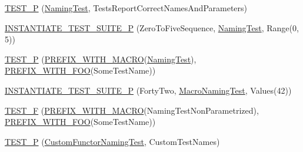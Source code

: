 \begin{DoxyCompactItemize}
\item 
\mbox{\hyperlink{_obj__test_2lib_2googletest-master_2googletest_2test_2googletest-param-test-test_8cc_a1f8ae152b21130f3ca99bdeab97e872a}{T\+E\+S\+T\+\_\+P}} (\mbox{\hyperlink{class_naming_test}{Naming\+Test}}, Tests\+Report\+Correct\+Names\+And\+Parameters)
\item 
\mbox{\hyperlink{_obj__test_2lib_2googletest-master_2googletest_2test_2googletest-param-test-test_8cc_a87cac0101217b77e84179b68e19cf84b}{I\+N\+S\+T\+A\+N\+T\+I\+A\+T\+E\+\_\+\+T\+E\+S\+T\+\_\+\+S\+U\+I\+T\+E\+\_\+P}} (Zero\+To\+Five\+Sequence, \mbox{\hyperlink{class_naming_test}{Naming\+Test}}, Range(0, 5))
\item 
\mbox{\hyperlink{_obj__test_2lib_2googletest-master_2googletest_2test_2googletest-param-test-test_8cc_a268b3f484920a6a3c08d911a47f07509}{T\+E\+S\+T\+\_\+P}} (\mbox{\hyperlink{_obj__test_2lib_2googletest-release-1_88_81_2googletest_2test_2googletest-param-test-test_8cc_aeb9b224f65fb5b0b8f2323a6903d6a68}{P\+R\+E\+F\+I\+X\+\_\+\+W\+I\+T\+H\+\_\+\+M\+A\+C\+RO}}(\mbox{\hyperlink{class_naming_test}{Naming\+Test}}), \mbox{\hyperlink{_obj__test_2lib_2googletest-release-1_88_81_2googletest_2test_2googletest-param-test-test_8cc_a6414de581a925e7399b27c14e38f8a67}{P\+R\+E\+F\+I\+X\+\_\+\+W\+I\+T\+H\+\_\+\+F\+OO}}(Some\+Test\+Name))
\item 
\mbox{\hyperlink{_obj__test_2lib_2googletest-master_2googletest_2test_2googletest-param-test-test_8cc_a193f1b24b3c213b2636a14ed661813a9}{I\+N\+S\+T\+A\+N\+T\+I\+A\+T\+E\+\_\+\+T\+E\+S\+T\+\_\+\+S\+U\+I\+T\+E\+\_\+P}} (Forty\+Two, \mbox{\hyperlink{class_macro_naming_test}{Macro\+Naming\+Test}}, Values(42))
\item 
\mbox{\hyperlink{_obj__test_2lib_2googletest-master_2googletest_2test_2googletest-param-test-test_8cc_a025432fa6a1d1a07929f6897f2dfdaea}{T\+E\+S\+T\+\_\+F}} (\mbox{\hyperlink{_obj__test_2lib_2googletest-release-1_88_81_2googletest_2test_2googletest-param-test-test_8cc_aeb9b224f65fb5b0b8f2323a6903d6a68}{P\+R\+E\+F\+I\+X\+\_\+\+W\+I\+T\+H\+\_\+\+M\+A\+C\+RO}}(Naming\+Test\+Non\+Parametrized), \mbox{\hyperlink{_obj__test_2lib_2googletest-release-1_88_81_2googletest_2test_2googletest-param-test-test_8cc_a6414de581a925e7399b27c14e38f8a67}{P\+R\+E\+F\+I\+X\+\_\+\+W\+I\+T\+H\+\_\+\+F\+OO}}(Some\+Test\+Name))
\item 
\mbox{\hyperlink{_obj__test_2lib_2googletest-master_2googletest_2test_2googletest-param-test-test_8cc_a64b9799ff848fbf906c2e5c93a66434a}{T\+E\+S\+T\+\_\+P}} (\mbox{\hyperlink{class_custom_functor_naming_test}{Custom\+Functor\+Naming\+Test}}, Custom\+Test\+Names)

\end{DoxyCompactItemize}
